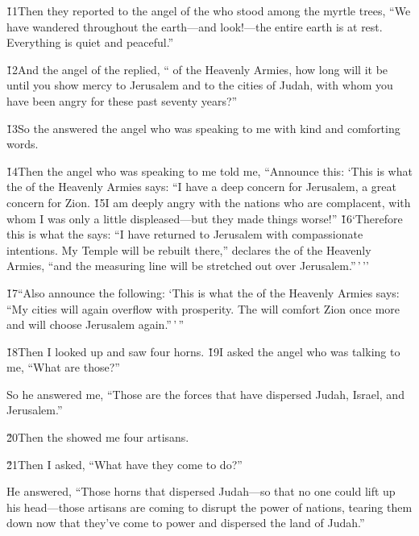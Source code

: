 \v{11}Then they reported to the angel of the  who stood among the myrtle trees, ``We have wandered throughout the earth---and look!---the entire earth is at rest. Everything is quiet and peaceful.''

\v{12}And the angel of the  replied, `` of the Heavenly Armies, how long will it be until you show mercy to Jerusalem and to the cities of Judah, with whom you have been angry for these past seventy years?''

\v{13}So the  answered the angel who was speaking to me with kind and comforting words.

\v{14}Then the angel who was speaking to me told me, ``Announce this: `This is what the  of the Heavenly Armies says: ``I have a deep concern for Jerusalem, a great concern for Zion. \v{15}I am deeply angry with the nations who are complacent, with whom I was only a little displeased---but they made things worse!'' \v{16}`Therefore this is what the  says: ``I have returned to Jerusalem with compassionate intentions. My Temple will be rebuilt there,'' declares the  of the Heavenly Armies, ``and the measuring line will be stretched out over Jerusalem.''\,'\,''

\v{17}``Also announce the following: `This is what the  of the Heavenly Armies says: ``My cities will again overflow with prosperity. The  will comfort Zion once more and will choose Jerusalem again.''\,'\,''

\v{18}Then I looked up and saw four horns. \v{19}I asked the angel who was talking to me, ``What are those?''

So he answered me, ``Those are the forces that have dispersed Judah, Israel, and Jerusalem.''

\v{20}Then the  showed me four artisans.

\v{21}Then I asked, ``What have they come to do?''

He answered, ``Those horns that dispersed Judah---so that no one could lift up his head---those artisans are coming to disrupt the power of nations, tearing them down now that they've come to power and dispersed the land of Judah.''

